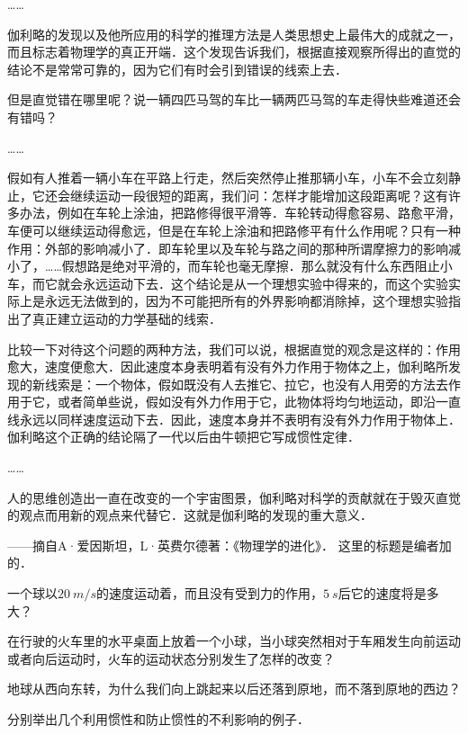 \begin{Test}
……

伽利略的发现以及他所应用的科学的推理方法是人类思想史上最伟大的成就之一，而且标志着物理学的真正开端．这个发现告诉我们，根据直接观察所得出的直觉的结论不是常常可靠的，因为它们有时会引到错误的线索上去．

但是直觉错在哪里呢？说一辆四匹马驾的车比一辆两匹马驾的车走得快些难道还会有错吗？

……

假如有人推着一辆小车在平路上行走，然后突然停止推那辆小车，小车不会立刻静止，它还会继续运动一段很短的距离，我们问：怎样才能增加这段距离呢？这有许多办法，例如在车轮上涂油，把路修得很平滑等．车轮转动得愈容易、路愈平滑，车便可以继续运动得愈远，但是在车轮上涂油和把路修平有什么作用呢？只有一种作用：外部的影响减小了．即车轮里以及车轮与路之间的那种所谓摩擦力的影响减小了，……假想路是绝对平滑的，而车轮也毫无摩擦．那么就没有什么东西阻止小车，而它就会永远运动下去．这个结论是从一个理想实验中得来的，而这个实验实际上是永远无法做到的，因为不可能把所有的外界影响都消除掉，这个理想实验指出了真正建立运动的力学基础的线索．

比较一下对待这个问题的两种方法，我们可以说，根据直觉的观念是这样的：作用愈大，速度便愈大．因此速度本身表明着有没有外力作用于物体之上，伽利略所发现的新线索是：一个物体，假如既没有人去推它、拉它，也没有人用旁的方法去作用于它，或者简单些说，假如没有外力作用于它，此物体将均匀地运动，即沿一直线永远以同样速度运动下去．因此，速度本身并不表明有没有外力作用于物体上．伽利略这个正确的结论隔了一代以后由牛顿把它写成惯性定律．

……

人的思维创造出一直在改变的一个宇宙图景，伽利略对科学的贡献就在于毁灭直觉的观点而用新的观点来代替它．这就是伽利略的发现的重大意义．


——摘自A·爱因斯坦，L·英费尔德著：《物理学的进化》．
这里的标题是编者加的．


\begin{Exercise}
	\begin{QsNum}
	    \item 一个球以$\SI{20}{m/s}$的速度运动着，而且没有受到力的作用，$\SI{5}{s}$后它的速度将是多大？
	    \item 在行驶的火车里的水平桌面上放着一个小球，当小球突然相对于车厢发生向前运动或者向后运动时，火车的运动状态分别发生了怎样的改变？
	    \item 地球从西向东转，为什么我们向上跳起来以后还落到原地，而不落到原地的西边？
	    \item 分别举出几个利用惯性和防止惯性的不利影响的例子．
    \end{QsNum}
\end{Exercise}






\end{Test}
